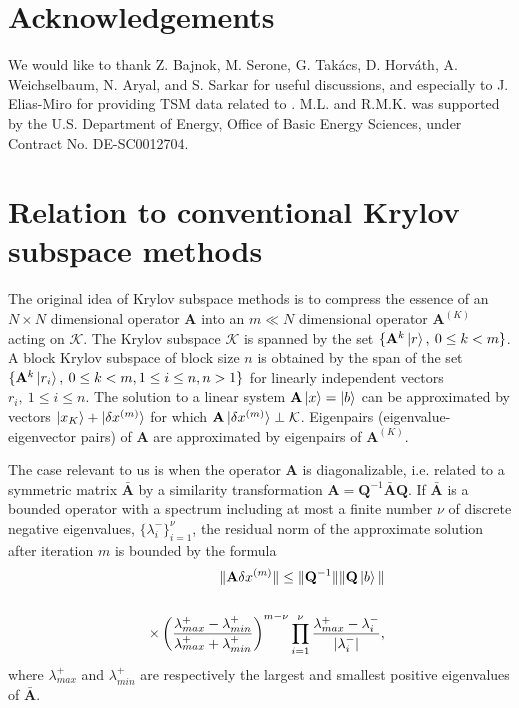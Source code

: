 \documentclass[twocolumn,secnumarabic,amssymb, nobibnotes, aps, prd]{revtex4-2}
\newcommand{\bea}{\begin{eqnarray}}
\newcommand{\eea}{\end{eqnarray}}
\begin{document}
\section*{Acknowledgements}
We would like to thank Z. Bajnok, M. Serone, G. Takács, D. Horváth, A. Weichselbaum, N. Aryal, and S. Sarkar for useful discussions, and especially to J. Elias-Miro for providing TSM data related to \cite{Elias-Miro:2017tup}.
M.L. and R.M.K. was supported by the U.S. Department of Energy, Office of Basic Energy Sciences, under Contract No. DE-SC0012704.


\appendix

\section{Relation to conventional Krylov subspace methods} \label{OtherKrylovRel}

The original idea of Krylov subspace methods is to compress the essence of an $N\times N$ dimensional operator $\mathbf{A}$ into an $m\ll N$ dimensional operator $\mathbf{A}^{(K)}$ acting on $\mathcal{K}$. 
The Krylov subspace $\mathcal{K}$ is spanned by the set $\{\mathbf{A}^k\ket{r},\:0\leq k < m\}$. A block Krylov subspace of block size $n$ is obtained by the span of the set $\{\mathbf{A}^k\ket{r_i},\:0\leq k < m,1\leq i\leq n, n>1\}$ for linearly independent vectors $r_i,\:1\leq i \leq n$.
The solution to a linear system $\mathbf{A}\ket{x}=\ket{b}$ can be approximated by vectors ${\ket{x_K}+\ket{\delta x^{(m)}}}$ for which $\mathbf{A}\ket{\delta x^{(m)}}\perp \mathcal{K}$. Eigenpairs (eigenvalue-eigenvector pairs) of $\mathbf{A}$ are approximated by eigenpairs  of $\mathbf{A}^{(K)}$. 

The case relevant to us is when the operator $\mathbf{A}$ is diagonalizable, i.e. related to a symmetric matrix $\bar{\mathbf{A}}$ by a similarity transformation $\mathbf{A}=\mathbf{Q}^{-1}\bar{\mathbf{A}}\mathbf{Q}$. If $\bar{\mathbf{A}}$ is a bounded operator with a spectrum including at most a finite number $\nu$ of discrete negative eigenvalues, 
$\{\lambda^-_i\}^\nu_{i=1}$, 
the residual norm of the approximate solution after iteration $m$ is bounded by the formula \cite{SaadSchultz,Elman1982IterativeMF}
\bea
&&\|\mathbf{A}\delta x^{(m)}\|\leq\|\mathbf{Q}^{-1}\|\|\mathbf{Q}\ket{b}\|\cr\cr
&&\times\left(\frac{\lambda_{max}^+-\lambda_{min}^+}{\lambda_{max}^++\lambda_{min}^+}\right)^{m-\nu}\prod_{i=1}^\nu\frac{\lambda_{max}^+-\lambda_i^-}{|\lambda_i^-|},\label{genBoundGMRES}
\eea
where $\lambda_{max}^+$ and $\lambda_{min}^+$ are respectively the largest and smallest positive eigenvalues of $\bar{\mathbf{A}}$.
\end{document}
